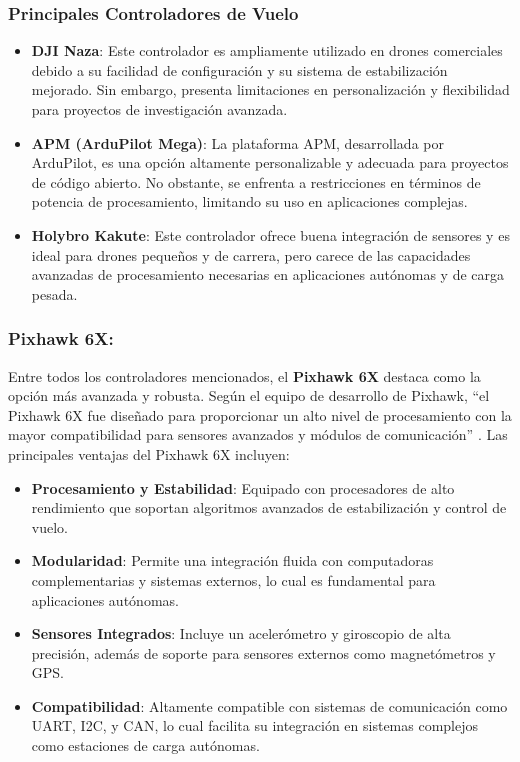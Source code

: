 \subsubsection{Principales Controladores de Vuelo}
\begin{itemize}
    \item \textbf{DJI Naza}: Este controlador es ampliamente utilizado en drones comerciales debido a su facilidad de configuración y su sistema de estabilización mejorado. Sin embargo, presenta limitaciones en personalización y flexibilidad para proyectos de investigación avanzada.
    \item \textbf{APM (ArduPilot Mega)}: La plataforma APM, desarrollada por ArduPilot, es una opción altamente personalizable y adecuada para proyectos de código abierto. No obstante, se enfrenta a restricciones en términos de potencia de procesamiento, limitando su uso en aplicaciones complejas.
    \item \textbf{Holybro Kakute}: Este controlador ofrece buena integración de sensores y es ideal para drones pequeños y de carrera, pero carece de las capacidades avanzadas de procesamiento necesarias en aplicaciones autónomas y de carga pesada.
\end{itemize}

\subsubsection{Pixhawk 6X: }

Entre todos los controladores mencionados, el \textbf{Pixhawk 6X} destaca como la opción más avanzada y robusta. Según el equipo de desarrollo de Pixhawk, “el Pixhawk 6X fue diseñado para proporcionar un alto nivel de procesamiento con la mayor compatibilidad para sensores avanzados y módulos de comunicación” \cite{pixhawk_docs}. Las principales ventajas del Pixhawk 6X incluyen:
\begin{itemize}
    \item \textbf{Procesamiento y Estabilidad}: Equipado con procesadores de alto rendimiento que soportan algoritmos avanzados de estabilización y control de vuelo.
    \item \textbf{Modularidad}: Permite una integración fluida con computadoras complementarias y sistemas externos, lo cual es fundamental para aplicaciones autónomas.
    \item \textbf{Sensores Integrados}: Incluye un acelerómetro y giroscopio de alta precisión, además de soporte para sensores externos como magnetómetros y GPS.
    \item \textbf{Compatibilidad}: Altamente compatible con sistemas de comunicación como UART, I2C, y CAN, lo cual facilita su integración en sistemas complejos como estaciones de carga autónomas.
\end{itemize}


